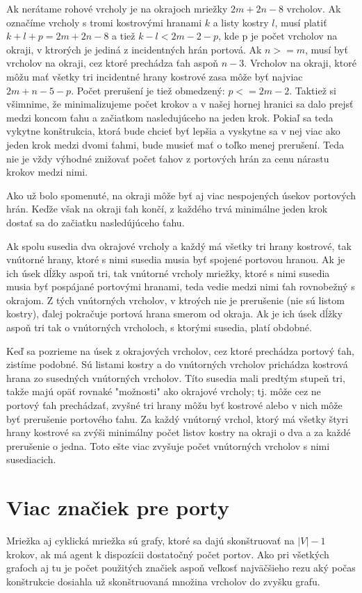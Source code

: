 Ak nerátame rohové vrcholy je na okrajoch mriežky $2m + 2n - 8$ vrcholov. 
Ak označíme vrcholy s tromi
kostrovými hranami $k$ a listy kostry $l$, musí platiť $k + l + p = 2m + 2n
- 8$ a tiež $k - l < 2m - 2 - p$, kde p je počet vrcholov na okraji, v
ktrorých je jediná z incidentných hrán portová.
Ak $n >= m$, musí byť vrcholov na okraji, cez ktoré prechádza ťah aspoň $n-3$.
Vrcholov na okraji, ktoré môžu mať všetky tri incidentné hrany kostrové zasa
môže byť najviac $2m + n - 5 - p$. Počet prerušení je tiež obmedzený: $p <=
2m - 2$. Taktiež si všimnime, že minimalizujeme počet krokov a v našej
hornej hranici sa dalo prejsť medzi koncom ťahu a začiatkom nasledujúceho na
jeden krok. Pokiaľ sa teda vykytne konštrukcia, ktorá bude chcieť byť
lepšia a vyskytne sa v nej viac ako jeden krok medzi dvomi ťahmi, bude
musieť mať o toľko menej prerušení. Teda nie je vždy výhodné znižovať počet
ťahov z portových hrán za cenu nárastu krokov medzi nimi.

Ako už bolo spomenuté, na okraji môže byť aj viac nespojených úsekov
portových hrán. Keďže však na okraji ťah končí, z každého trvá minimálne
jeden krok dostať sa do začiatku nasledújúceho ťahu.

Ak spolu susedia dva okrajové vrcholy a každý má všetky tri hrany kostrové,
tak vnútorné hrany, ktoré s nimi susedia musia byť spojené portovou hranou.
Ak je ich úsek dĺžky aspoň tri, tak vnútorné vrcholy mriežky, ktoré s nimi
susedia musia byť pospájané portovými hranami, teda vedie medzi nimi ťah
rovnobežný s okrajom. Z tých vnútorných vrcholov, v ktroých nie je
prerušenie (nie sú listom kostry), ďalej pokračuje portová hrana smerom od
okraja. Ak je ich úsek dĺžky aspoň tri tak o vnútorných vrcholoch, s ktorými
susedia, platí obdobné.

Keď sa pozrieme na úsek z okrajových vrcholov, cez ktoré prechádza portový
ťah, zistíme podobné. Sú listami kostry a do vnútorných vrcholov prichádza
kostrová hrana zo susedných vnútorných vrcholov. Títo susedia mali predtým
stupeň tri, takže majú opäť rovnaké "možnosti" ako okrajové vrcholy; tj.
môže cez ne portový ťah prechádzať, zvyšné tri hrany môžu byť kostrové
alebo v nich môže byť prerušenie portového ťahu. Za každý vnútorný vrchol,
ktorý má všetky štyri hrany kostrové sa zvýši minimálny počet listov kostry
na okraji o dva a za každé prerušenie o jedna. Toto ešte viac zvyšuje počet
vnútorných vrcholov s nimi susediacich.





\section{Viac značiek pre porty}
Mriežka aj cyklická mriežka sú grafy, ktoré sa dajú skonštruovať na $|V| - 1$
krokov, ak má agent k dispozícii dostatočný počet portov. Ako pri všetkých
grafoch aj tu je počet použitých značiek aspoň veľkosť najväčšieho rezu aký
počas konštrukcie dosiahla už skonštruovaná množina vrcholov do zvyšku
grafu.

